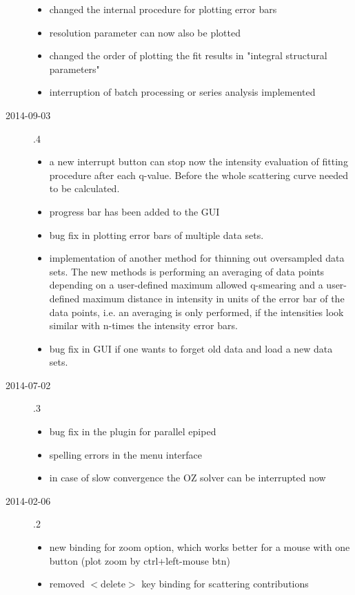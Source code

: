 \begin{description}
\begin{itemize}
        \item changed the internal procedure for plotting error bars
        \item resolution parameter can now also be plotted
        \item changed the order of plotting the fit results
            in "integral structural parameters"
        \item interruption of batch processing or series analysis implemented
    \end{itemize}
\item[2014-09-03] .4
    \begin{itemize}
    \item a new interrupt button can stop now the intensity evaluation of fitting
        procedure after each q-value. Before the whole scattering curve needed to be
        calculated.
    \item progress bar has been added to the GUI
    \item bug fix in plotting error bars of multiple data sets.
    \item implementation of another method for thinning out oversampled data sets. The
        new methods is performing an averaging of data points depending on a
        user-defined maximum allowed q-smearing and a user-defined maximum distance
        in intensity in units of the error bar of the data points, i.e. an averaging is
        only performed, if the intensities look similar with n-times the intensity
        error bars.
    \item bug fix in GUI if one wants to forget old data and load a new data sets.
    \end{itemize}
    \item[2014-07-02] .3
    \begin{itemize}
        \item bug fix in the plugin for parallel epiped
        \item spelling errors in the menu interface
        \item in case of slow convergence the OZ solver can be interrupted now
    \end{itemize}
    \item[2014-02-06] .2
    \begin{itemize}
        \item new binding for zoom option, which works better for a mouse with one button
              (plot zoom by ctrl+left-mouse btn)
        \item removed $<$delete$>$ key binding for scattering contributions

\end{itemize}
\end{description}

